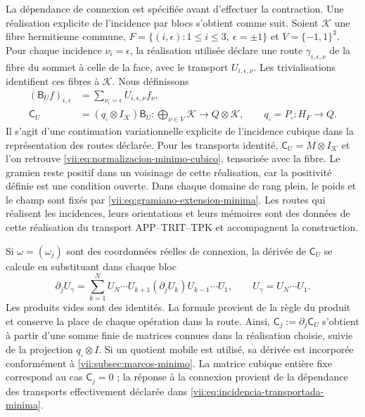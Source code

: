 La dépendance de connexion est spécifiée avant d'effectuer la
contraction. Une réalisation explicite de l'incidence par blocs
s'obtient comme suit. Soient \(\mathcal K\) une fibre hermitienne commune,
\(F=\{(i,\epsilon):1\leq i\leq3,\ \epsilon=\pm1\}\) et
\(V=\{-1,1\}^3\). Pour chaque incidence \(\nu_i=\epsilon\),
la réalisation utilisée déclare une route \(\gamma_{i,\epsilon,\nu}\)
de la fibre du sommet à celle de la face, avec le transport
\(U_{i,\epsilon,\nu}\). Les trivialisations identifient ces fibres
à \(\mathcal K\). Nous définissons
\begin{equation}
 \begin{split}
 (\mathsf B_Uf)_{i,\epsilon}
   &=\sum_{\nu_i=\epsilon}U_{i,\epsilon,\nu}f_\nu,\\
 \mathsf C_U&=(q_\square\otimes I_{\mathcal K})\mathsf B_U:
   \bigoplus_{\nu\in V}\mathcal K\longrightarrow Q\otimes\mathcal K,
 \qquad q_\square=P_\square:H_F\to Q.
 \end{split}
 \label{vii:eq:incidencia-transportada-minima}
\end{equation}
Il s'agit d'une continuation variationnelle explicite de l'incidence cubique
dans la représentation des routes déclarée. Pour les transports identité,
\(\mathsf C_U=M\otimes I_{\mathcal K}\) et l'on retrouve
\eqref{vii:eq:normalizacion-minimo-cubico}, tensorisée avec la fibre.
Le gramien reste positif dans un voisinage de cette réalisation,
car la positivité définie est une condition ouverte. Dans chaque domaine
de rang plein, le poids et le champ sont fixés par
\eqref{vii:eq:gramiano-extension-minima}. Les routes qui réalisent les
incidences, leurs orientations et leurs mémoires sont des données de cette
réalisation du transport APP--TRIT--TPK et accompagnent la construction.

Si \(\omega=(\omega_j)\) sont des coordonnées réelles de connexion, la dérivée de \(\mathsf C_U\) se calcule en substituant dans chaque bloc
\begin{equation}
 \partial_j U_\gamma
 =\sum_{k=1}^{N}
    U_N\cdots U_{k+1}(\partial_jU_k)U_{k-1}\cdots U_1,
 \qquad U_\gamma=U_N\cdots U_1.
 \label{vii:eq:derivada-incidencia-rutas}
\end{equation}
Les produits vides sont des identités. La formule provient de la règle du produit et conserve la place de chaque opération dans la route. Ainsi, \(\mathsf C_j:=\partial_j\mathsf C_U\) s'obtient à partir d'une somme finie de matrices connues dans la réalisation choisie, suivie de la projection \(q_\square\otimes I\). Si un quotient mobile est utilisé, sa dérivée est incorporée conformément à \ref{vii:subsec:marcos-minimo}. La matrice cubique entière fixe correspond au cas \(\mathsf C_j=0\) ; la réponse à la connexion provient de la dépendance des transports effectivement déclarée dans \eqref{vii:eq:incidencia-transportada-minima}.

